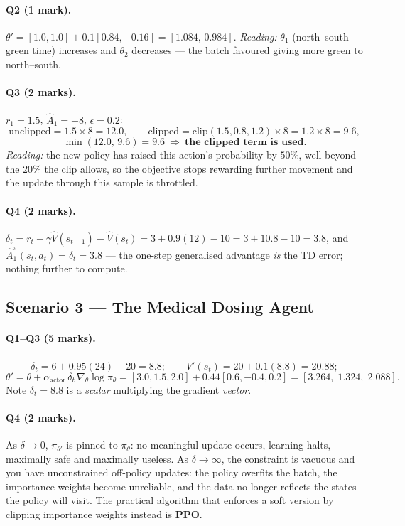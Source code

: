 \documentclass[11pt,a4paper]{article}
\begin{document}
\paragraph{Q2 (1 mark).}
$\theta'=[1.0,1.0]+0.1[0.84,-0.16]=\mathbf{[1.084,\,0.984]}$.
\emph{Reading:} $\theta_1$ (north--south green time) increases and $\theta_2$
decreases --- the batch favoured giving more green to north--south.

\paragraph{Q3 (2 marks).} $r_1=1.5$, $\hat A_1=+8$, $\epsilon=0.2$:
\[
\text{unclipped}=1.5\times 8=12.0,\qquad
\text{clipped}=\mathrm{clip}(1.5,0.8,1.2)\times 8=1.2\times 8=9.6,
\]
\[
\min(12.0,\,9.6)=\mathbf{9.6}\ \Rightarrow\ \textbf{the clipped term is used.}
\]
\emph{Reading:} the new policy has raised this action's probability by
$50\%$, well beyond the $20\%$ the clip allows, so the objective stops
rewarding further movement and the update through this sample is throttled.

\paragraph{Q4 (2 marks).}
$\delta_t=r_t+\gamma\hat V(s_{t+1})-\hat V(s_t)=3+0.9(12)-10=3+10.8-10=\mathbf{3.8}$,
and $\hat A^\pi_1(s_t,a_t)=\delta_t=\mathbf{3.8}$ --- the one-step
generalised advantage \emph{is} the TD error; nothing further to compute.

\subsection{Scenario 3 --- The Medical Dosing Agent}

\paragraph{Q1--Q3 (5 marks).}
\[
\delta_t=6+0.95(24)-20=\mathbf{8.8};\qquad
\hat V'(s_t)=20+0.1(8.8)=\mathbf{20.88};
\]
\[
\theta'=\theta+\alpha_{\text{actor}}\,\delta_t\,\nabla_\theta\log\pi_\theta
=[3.0,1.5,2.0]+0.44[0.6,-0.4,0.2]=\mathbf{[3.264,\;1.324,\;2.088]} .
\]
Note $\delta_t=8.8$ is a \emph{scalar} multiplying the gradient \emph{vector}.

\paragraph{Q4 (2 marks).} As $\delta\to 0$, $\pi_{\theta'}$ is pinned to
$\pi_\theta$: no meaningful update occurs, learning halts, maximally safe and
maximally useless. As $\delta\to\infty$, the constraint is vacuous and you
have unconstrained off-policy updates: the policy overfits the batch, the
importance weights become unreliable, and the data no longer reflects the
states the policy will visit. The practical algorithm that enforces a soft
version by clipping importance weights instead is \textbf{PPO}.
\end{document}

